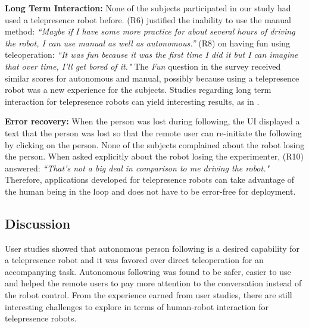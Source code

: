 \textbf{Long Term Interaction:} None of the subjects participated in our study had used a telepresence robot before. (R6) justified the inability to use the manual method: \emph{``Maybe if I have some more practice for about several hours of driving the robot, I can use manual as well as autonomous.''} (R8) on having fun using teleoperation: \emph{``It was fun because it was the first time I did it but I can imagine that over time, I'll get bored of it."} The \emph{Fun} question in the survey received similar scores for autonomous and manual, possibly because using a telepresence robot was a new experience for the subjects. Studies regarding long term interaction for telepresence robots can yield interesting results, as in \cite{lee2011now}.

\textbf{Error recovery:} When the person was lost during following, the UI displayed a text that the person was lost so that the remote user can re-initiate the following by clicking on the person. None of the subjects complained about the robot losing the person. When asked explicitly about the robot losing the experimenter, (R10) answered: \emph{``That's not a big deal in comparison to me driving the robot."} Therefore, applications developed for telepresence robots can take advantage of the human being in the loop and does not have to be error-free for deployment.

\subsection{Discussion}

User studies showed that autonomous person following
is a desired capability for a telepresence robot and it was
favored over direct teleoperation for an accompanying task.
Autonomous following was found to be safer, easier to use
and helped the remote users to pay more attention to the
conversation instead of the robot control. From the experience
earned from user studies, there are still interesting
challenges to explore in terms of human-robot interaction for
telepresence robots.

